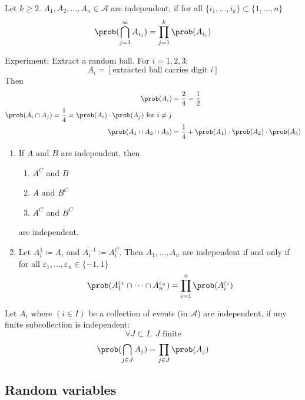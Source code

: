 \documentclass[mfit.tex]{subfiles}
\begin{document}
\begin{defi*}
  Let $k \geq 2$. $A_1,A_2,\dots,A_n \in \mathcal{A}$ are independent, if for all $\{i_1,\dots,i_k\} \subset \{1,\dots,n\}$
  \[ \prob(\bigcap_{j=1}^\infty A_{i_j}) = \prod_{j=1}^k \prob(A_{i_j}) \]
\end{defi*}

\begin{ex}
  Experiment: Extract a random ball.
  For $i = 1,2,3$:
  \[ A_i = [\text{extracted ball carries digit } i] \]
  Then
  \begin{align*}
    \prob(A_i) &= \frac{2}{4} = \frac{1}{2} \\
    \prob(A_i \cap A_j) = \frac{1}{4} = \prob(A_i) \cdot \prob(A_j) \text{ for } i \neq j \\
    \prob(A_1 \cap A_2 \cap A_3) &= \frac{1}{4} + \prob(A_1) \cdot \prob(A_2) \cdot \prob(A_3)
  \end{align*}
\end{ex}

\begin{obs}
  \begin{enumerate}
    \item If $A$ and $B$ are independent, then
    \begin{enumerate}
      \item $A^C$ and $B$
      \item $A$ and $B^C$
      \item $A^C$ and $B^C$
    \end{enumerate}
    are independent.
    \item Let $A_i^1 \coloneq A_i$ and $A_i^{-1} \coloneq A_i^C$.
    Then $A_1,\dots,A_n$ are independent if and only if for all $\varepsilon_1,\dots,\varepsilon_n \in \{-1,1\}$
    \[ \prob(A_1^{\varepsilon_1} \cap \dots \cap A_n^{\varepsilon_n}) = \prod_{i=1}^n \prob(A_i^{\varepsilon_i}) \]
  \end{enumerate}
\end{obs}

\begin{defi*}
  Let $A_i$ where $(i \in I)$ be a collection of events (in $\mathcal{A}$) are independent, if any finite subcollection is independent:
  \[ \forall J \subset I, \: J \text{ finite} \]
  \[ \prob(\bigcap_{j \in J} A_j) = \prod_{j \in J} \prob(A_j) \]
\end{defi*}


\subsection{Random variables}
\end{document}
